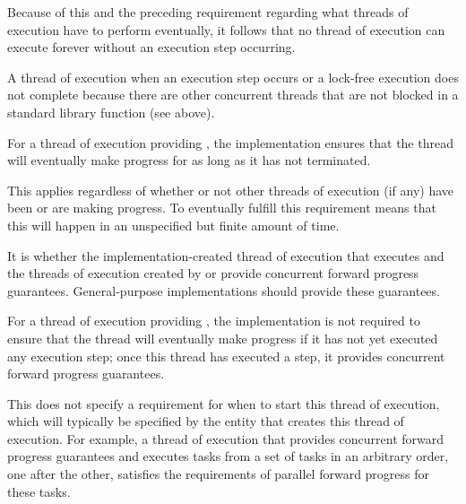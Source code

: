 \pnum
\begin{note}
Because of this and the preceding requirement regarding what threads of execution
have to perform eventually, it follows that no thread of execution can execute
forever without an execution step occurring.
\end{note}

\pnum
A thread of execution 
when an execution step occurs or a
lock-free execution does not complete because there are other concurrent threads
that are not blocked in a standard library function (see above).

\pnum
{}%
For a thread of execution providing ,
the implementation ensures that the thread will eventually make progress for as
long as it has not terminated.
\begin{note}
This applies regardless of whether or not other threads of execution (if any)
have been or are making progress. To eventually fulfill this requirement means that
this will happen in an unspecified but finite amount of time.
\end{note}

\pnum
It is  whether the
implementation-created thread of execution that executes
 and the threads of execution created by
or 
provide concurrent forward progress guarantees.
General-purpose implementations should provide these guarantees.

\pnum
{}%
For a thread of execution providing ,
the implementation is not required to ensure that the thread will eventually make
progress if it has not yet executed any execution step; once this thread has
executed a step, it provides concurrent forward progress guarantees.

\pnum
\begin{note}
This does not specify a requirement for when to start this thread of execution,
which will typically be specified by the entity that creates this thread of
execution. For example, a thread of execution that provides concurrent forward
progress guarantees and executes tasks from a set of tasks in an arbitrary order,
one after the other, satisfies the requirements of parallel forward progress for
these tasks.
\end{note}

